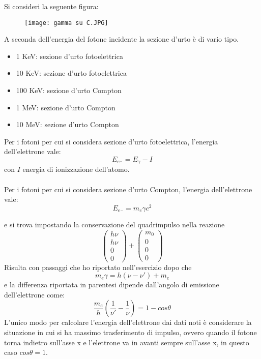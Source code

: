 \documentclass[twoside]{article}
\begin{document}
Si consideri la seguente figura:

\begin{figure}[H]
    \centering
    \texttt{[image: gamma su C.JPG]}
\end{figure}
A seconda dell'energia del fotone incidente la sezione d'urto è di vario tipo.
\\
\begin{itemize}
    \item 1 KeV: sezione d'urto fotoelettrica
    \item 10 KeV: sezione d'urto fotoelettrica
    \item 100 KeV: sezione d'urto Compton
    \item 1 MeV: sezione d'urto Compton
    \item 10 MeV: sezione d'urto Compton
\end{itemize}

Per i fotoni per cui si considera sezione d'urto fotoelettrica, l'energia dell'elettrone vale:
\begin{equation}
     E_{e^-}=E_{\gamma}- I
\end{equation}
con $I$ energia di ionizzazione dell'atomo.\\
\\
Per i fotoni per cui si considera sezione d'urto Compton, l'energia dell'elettrone vale:
\begin{equation}
    E_{e^-}=m_e\gamma c^2
\end{equation}

e si trova impostando la conservazione del quadrimpulso nella reazione
\begin{equation}
    \left(\begin{array}{lr}
         h\nu  \\
         h\nu \\
         0 \\
         0
    \end{array} \right)+\left( \begin{array}{lr}
         m_0  \\
         0 \\
         0 \\
         0
    \end{array} \right)
\end{equation}
Risulta con passaggi che ho riportato nell'esercizio dopo che
\begin{equation}
    m_e\gamma=h(\nu -\nu') +m_e
\end{equation}
e la differenza riportata in parentesi dipende dall'angolo di emissione dell'elettrone come:
\begin{equation}
    \frac{m_e}{h}\left( \frac{1}{\nu'}-\frac{1}{\nu} \right)=1-cos\theta
\end{equation}
L'unico modo per calcolare l'energia dell'elettrone dai dati noti è considerare la situazione in cui si ha massimo trasferimento di impulso, ovvero quando il fotone torna indietro sull'asse x e l'elettrone va in avanti sempre sull'asse x, in questo caso $cos\theta=1$.
\end{document}
